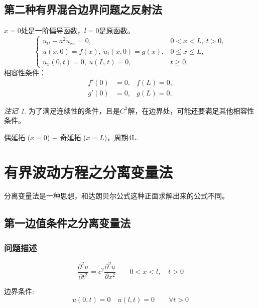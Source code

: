 \documentclass[a4paper, 12pt, oneside]{article} %
\numberwithin{subsection}{section}
\numberwithin{subsubsection}{subsection}
\theoremstyle{plain}
\theoremstyle{definition}
\theoremstyle{remark}
\newtheorem{remark}[theorem]{注记}
\begin{document}
		\subsection{第二种有界混合边界问题之反射法}
		$x=0$处是一阶偏导函数，$ l=0$是原函数。
		\begin{equation}
			\begin{cases}
				u_{tt} - a^2 u_{xx} = 0, & 0 < x < L, \ t > 0, \\
				u(x, 0) = f(x), \ u_t(x, 0) = g(x), & 0 \leq x \leq L, \\
				u_x(0, t) = 0, \ u(L, t) = 0, & t \geq 0.
			\end{cases}
		\end{equation}
		相容性条件：
		\begin{equation}
			\begin{aligned}
				f'(0) & = 0, & f(L)  = 0, \\
				g'(0) & =0, & g(L)  = 0,
			\end{aligned}
		\end{equation}
		\begin{remark}
			为了满足连续性的条件，且是$C^2$解，在边界处，可能还要满足其他相容性条件。
		\end{remark}
		
		偶延拓 ($x=0$) + 奇延拓 ($x=L$)，周期4L.
		
		
		
		
		
		\section{有界波动方程之分离变量法}
		分离变量法是一种思想，和达朗贝尔公式这种正面求解出来的公式不同。
		\subsection{第一边值条件之分离变量法}
		\subsubsection{问题描述}
		\begin{equation} \label{eq:wave_equation}
			\frac{\partial^2 u}{\partial t^2} = c^2 \frac{\partial^2 u}{\partial x^2} \qquad 0 < x < l, \quad t > 0
		\end{equation}
		
		边界条件:
		\begin{equation} \label{eq:boundary_conditions}
			u(0, t) = 0 \quad u(l, t) = 0 \qquad \forall t > 0
		\end{equation}
		
\end{document}
